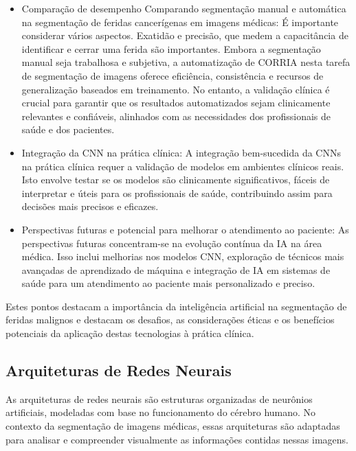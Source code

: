 \begin{itemize}
    \item Comparação de desempenho Comparando segmentação manual e automática na segmentação de feridas cancerígenas em imagens médicas: É importante considerar vários aspectos. Exatidão e precisão, que medem a capacitância de identificar e cerrar uma ferida são importantes. Embora a segmentação manual seja trabalhosa e subjetiva, a automatização de CORRIA nesta tarefa de segmentação de imagens oferece eficiência, consistência e recursos de generalização baseados em treinamento. No entanto, a validação clínica é crucial para garantir que os resultados automatizados sejam clinicamente relevantes e confiáveis, alinhados com as necessidades dos profissionais de saúde e dos pacientes.

    \item Integração da \ac{CNN} na prática clínica: A integração bem-sucedida da \ac{CNNs} na prática clínica requer a validação de modelos em ambientes clínicos reais. Isto envolve testar se os modelos são clinicamente significativos, fáceis de interpretar e úteis para os profissionais de saúde, contribuindo assim para decisões mais precisos e eficazes.

    \item Perspectivas futuras e potencial para melhorar o atendimento ao paciente: As perspectivas futuras concentram-se na evolução contínua da IA na área médica. Isso inclui melhorias nos modelos \ac{CNN}, exploração de técnicos mais avançadas de aprendizado de máquina e integração de IA em sistemas de saúde para um atendimento ao paciente mais personalizado e preciso.
    
\end{itemize}

Estes pontos destacam a importância da inteligência artificial na segmentação de feridas malignos e destacam os desafios, as considerações éticas e os benefícios potenciais da aplicação destas tecnologias à prática clínica.

\subsection{Arquiteturas de Redes Neurais}

As arquiteturas de redes neurais são estruturas organizadas de neurônios artificiais, modeladas com base no funcionamento do cérebro humano. No contexto da segmentação de imagens médicas, essas arquiteturas são adaptadas para analisar e compreender visualmente as informações contidas nessas imagens. \cite{dean2022golden} \cite{jiang2023vig}

